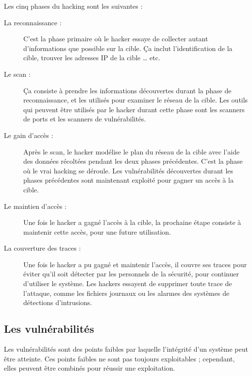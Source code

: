     Les cinq phases du hacking sont les suivantes \cite{phases_of_hacking} :
    \begin{description}
        \item[La reconnaissance :] C'est la phase primaire où le hacker essaye de collecter autant d'informations que
        possible sur la cible. Ça inclut l'identification de la cible, trouver les adresses IP \cite{reseau}
        de la cible \ldots{} etc.

        \item[Le scan :] Ça consiste à prendre les informations découvertes durant la phase de reconnaissance, et 
            les utilisés pour examiner le réseau de la cible. Les outils qui peuvent être utilisés par 
            le hacker durant cette phase sont les scanners de ports et les scanners de vulnérabilités.

        \item[Le gain d'accès :]  Après le scan, le hacker modélise le plan du réseau de la cible avec l'aide
            des données récoltées pendant les deux phases précédentes. C'est la 
            phase où le vrai hacking se déroule. Les vulnérabilités découvertes durant les phases précédentes sont 
            maintenant exploité pour gagner un accès à la cible.

        \item[Le maintien d'accès :] Une fois le hacker a gagné l'accès à la cible, la prochaine étape consiste à 
            maintenir cette accès, pour une future utilisation.

        \item[La couverture des traces :] Une fois le hacker a pu gagné et maintenir l'accès, il couvre ses traces 
            pour éviter qu'il soit détecter par les personnels de la sécurité, pour continuer d'utiliser le système.
            Les hackers essayent de supprimer toute trace de l'attaque, comme les fichiers journaux ou 
            les alarmes des systèmes de détections d'intrusions.

    \end{description}

    \subsection{Les vulnérabilités}
    Les vulnérabilités sont des points faibles par laquelle l'intégrité d'un système peut être atteinte. Ces points 
    faibles ne sont pas toujours exploitables ; cependant, elles peuvent être combinés pour réussir une exploitation. 
    
